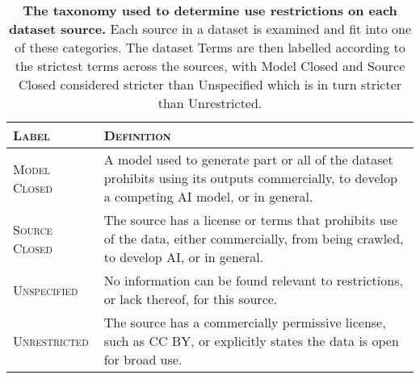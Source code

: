 \begin{table*}[t!]
\centering
\begin{adjustbox}{width=1.0\textwidth}
\begin{tabular}{p{}|p{}}
\toprule
\textsc{Label} & \textsc{Definition} \\
\midrule
\textsc{Model Closed} & A model used to generate part or all of the dataset prohibits using its outputs commercially, to develop a competing AI model, or in general. \\
\textsc{Source Closed} & The source has a license or terms that prohibits use of the data, either commercially, from being crawled, to develop AI, or in general. \\
\textsc{Unspecified} & No information can be found relevant to restrictions, or lack thereof, for this source. \\
\textsc{Unrestricted} & The source has a commercially permissive license, such as CC BY, or explicitly states the data is open for broad use. \\
\bottomrule
\end{tabular}
\end{adjustbox}
\caption{\textbf{The taxonomy used to determine use restrictions on each dataset source.} Each source in a dataset is examined and fit into one of these categories. The dataset Terms are then labelled according to the strictest terms across the sources, with Model Closed and Source Closed considered stricter than Unspecified which is in turn stricter than Unrestricted.}
\label{tab:terms-taxonomy}
\end{table*}
